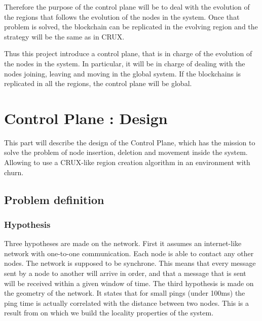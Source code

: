 \documentclass[a4paper,11pt,oneside]{report}
\begin{document}
Therefore the purpose of the control plane will be to deal with the evolution
of the regions that follows the evolution of the nodes in the system. Once that
problem is solved, the blockchain can be replicated in the evolving region and
the strategy will be the same as in CRUX. 

Thus this project introduce a control plane, that is in charge of the evolution
of the nodes in the system. In particular, it will be in charge of dealing with
the nodes joining, leaving and moving in the global system. If the blockchains
is replicated in all the regions, the control plane will be global. 

\chapter{Control Plane : Design}

This part will describe the design of the Control Plane, which has the mission
to solve the problem of node insertion, deletion and movement inside the
system. Allowing to use a CRUX-like region creation algorithm in an environment
with churn. 

\section{Problem definition}

\subsection{Hypothesis} Three hypotheses are made on the network. First it
assumes an internet-like network with one-to-one communication. Each node is
able to contact any other nodes. The network is supposed to be synchrone. This
means that every message sent by a node to another will arrive in order, and
that a message that is sent will be received within a given window of time. The
third hypothesis is made on the geometry of the network. It states that for
small pings (under 100ms) the ping time is actually correlated with the
distance between two nodes. This is a result from \cite{locality-result} on
which we build the locality properties of the system. 
\end{document}
